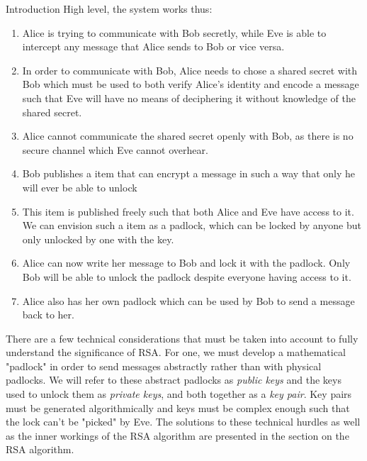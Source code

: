 \documentclass[landscape,fontscale=.4,paperwidth=48in,paperheight=36in]{baposter} %
\begin{document}
\begin{poster}
\begin{posterbox}[name=intro,column=0,below=objectives, span=13]{Introduction}
High level, the system works thus:
\begin{enumerate}
	\item Alice is trying to communicate with Bob secretly, while Eve is able to intercept any message that Alice sends to Bob or vice versa.
	\item In order to communicate with Bob, Alice needs to chose a shared secret with Bob which must be used to both verify Alice's identity and encode a message such that Eve will have no means of deciphering it without knowledge of the shared secret.
	\item Alice cannot communicate the shared secret openly with Bob, as there is no secure channel which Eve cannot overhear.
	\item Bob publishes a item that can encrypt a message in such a way that only he will ever be able to unlock
	\item This item is published freely such that both Alice and Eve have access to it. We can envision such a item as a padlock, which can be locked by anyone but only unlocked by one with the key.
	\item Alice can now write her message to Bob and lock it with the padlock. Only Bob will be able to unlock the padlock despite everyone having access to it.
	\item Alice also has her own padlock which can be used by Bob to send a message back to her.
\end{enumerate}

There are a few technical considerations that must be taken into account to fully understand the significance of RSA. For one, we must develop a mathematical "padlock" in order to send messages abstractly rather than with physical padlocks. We will refer to these abstract padlocks as \emph{public keys} and the keys used to unlock them as \emph{private keys}, and both together as a \emph{key pair}. Key pairs must be generated algorithmically and keys must be complex enough such that the lock can't be "picked" by Eve. The solutions to these technical hurdles as well as the inner workings of the RSA algorithm are presented in the section on the RSA algorithm.
\end{posterbox}











\end{poster}
\end{document}
